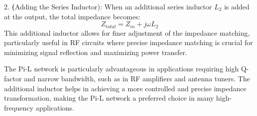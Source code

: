 2. \textbf(Adding the Series Inductor): When an additional series inductor \( L_2 \) is added at the output, the total impedance becomes:
   \[
   Z_{total} = Z_{in} + j\omega L_2
   \]
   This additional inductor allows for finer adjustment of the impedance matching, particularly useful in RF circuits where precise impedance matching is crucial for minimizing signal reflection and maximizing power transfer.

The Pi-L network is particularly advantageous in applications requiring high Q-factor and narrow bandwidth, such as in RF amplifiers and antenna tuners. The additional inductor helps in achieving a more controlled and precise impedance transformation, making the Pi-L network a preferred choice in many high-frequency applications.

